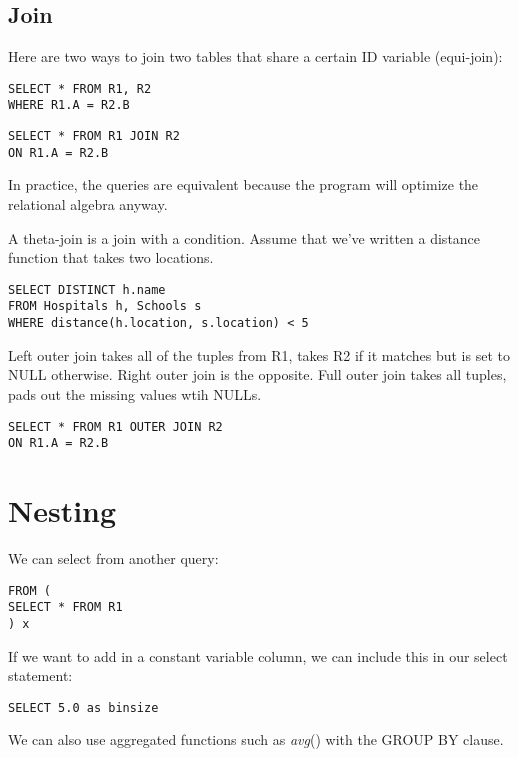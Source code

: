 \documentclass{article}
\begin{document}
\subsection{Join}

Here are two ways to join two tables that share a certain ID variable (equi-join):

\begin{verbatim}
SELECT * FROM R1, R2
WHERE R1.A = R2.B
\end{verbatim}

\begin{verbatim}
SELECT * FROM R1 JOIN R2
ON R1.A = R2.B
\end{verbatim}

In practice, the queries are equivalent because the program will optimize the relational algebra anyway. 

A theta-join is a join with a condition. Assume that we've written a distance function that takes two locations.

\begin{verbatim}
SELECT DISTINCT h.name
FROM Hospitals h, Schools s
WHERE distance(h.location, s.location) < 5
\end{verbatim}

Left outer join takes all of the tuples from R1, takes R2 if it matches but is set to NULL otherwise. Right outer join is the opposite. Full outer join takes all tuples, pads out the missing values wtih NULLs.

\begin{verbatim}
SELECT * FROM R1 OUTER JOIN R2
ON R1.A = R2.B
\end{verbatim}

\section{Nesting}

We can select from another query:

\begin{verbatim}
FROM (
SELECT * FROM R1
) x 
\end{verbatim}

If we want to add in a constant variable column, we can include this in our select statement:

\begin{verbatim}
SELECT 5.0 as binsize
\end{verbatim}

We can also use aggregated functions such as \emph{avg}() with the GROUP BY clause. 
\end{document}
